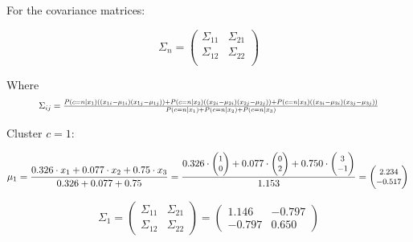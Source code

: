 \documentclass[12pt]{article}
\begin{document}
\begin{enumerate}
        \vspace{10pt}
        For the covariance matrices:

        \begin{equation}\label{covariance_matrix}
            \Sigma_n = \begin{pmatrix}
                \Sigma_{11} & \Sigma_{21} \\
                \Sigma_{12} & \Sigma_{22} \\
            \end{pmatrix}
        \end{equation}
        
        Where
        \begin{equation*}
            \resizebox{0.88\hsize}{!}{$
            \Sigma_{ij} = \frac{
              P(c=n|x_1)\left(\left(x_{1i} - \mu_{1i}\right) \left(x_{1j}- \mu_{1j}\right)\right) 
            + P(c=n|x_2)\left(\left(x_{2i} - \mu_{2i}\right) \left(x_{2j}- \mu_{2j}\right)\right) 
            + P(c=n|x_3)\left(\left(x_{3i} - \mu_{3i}\right) \left(x_{3j}- \mu_{3j}\right)\right)
            }{P(c=n|x_1) + P(c=n|x_2) + P(c=n|x_3)}
            $}
        \end{equation*}
        
        \newpage
         Cluster $c=1$:

        \begin{equation*}
            \fontsize{8pt}{10pt}\selectfont
            \mu_1 = \frac{0.326 \cdot x_1 + 0.077 \cdot x_2 + 0.75 \cdot x_3}{0.326+0.077+0.75} = \frac{0.326 \cdot \begin{pmatrix}
            1\\
            0
            \end{pmatrix}+ 0.077 \cdot \begin{pmatrix}
            0\\
            2
            \end{pmatrix} + 0.750 \cdot \begin{pmatrix}
            3\\
            -1
            \end{pmatrix}}{1.153} = \begin{pmatrix}
            2.234\\
            -0.517
            \end{pmatrix}\\
        \end{equation*}

        \begin{equation*}
            \Sigma_1 = \begin{pmatrix}
                \Sigma_{11} & \Sigma_{21} \\
                \Sigma_{12} & \Sigma_{22}
            \end{pmatrix} = \begin{pmatrix}
                1.146 & -0.797\\
                -0.797 & 0.650
            \end{pmatrix}
        \end{equation*}


\end{enumerate}
\end{document}

